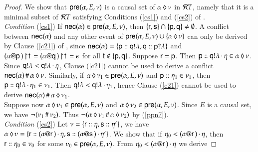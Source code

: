 \begin{proof}
  We show that ${\sf pre}(\alpha,E,\nu)$ is a causal set of
${\alpha}\,\lozenge\,{\nu}$ in ${\mathcal RT}$, namely that it is a minimal 
subset of ${\mathcal RT}$ satisfying Conditions (\ref{cs1}) and
(\ref{cs2}) of .\\ %
{\em Condition }(\ref{cs1}) If ${\sf nec}(\alpha) \in {\sf pre}(\alpha,E,\nu)$, then
$\{{\sf r},{\sf s}\} \cap \{{\sf p},{\sf q}\} \neq \emptyset$. A conflict between ${\sf nec}(\alpha)$ and any other event of
${\sf pre}(\alpha,E,\nu) \cup \{{\alpha}\,\lozenge\,{\nu}\}$ can only be derived
by Clause (\ref{c21}) of , since ${\sf nec}(\alpha)
=\{{\sf p}:: {\sf q}!\lambda,
  {\sf q}:: {\sf p}?\lambda\}$ and
$(\alpha @ {\sf p}\,) \! \upharpoonright \! {\sf t}\, = (\alpha @ {\sf q}\,) \! \upharpoonright \! {\sf t}\,
= \epsilon$ for all ${\sf t}\not\in\{{\sf p},{\sf q}\}$.  Suppose ${\sf r}
= {\sf p}$. Then ${\sf p}:: {\sf q}!\lambda\,{\cdot}\,\eta\in
{\alpha}\,\lozenge\,{\nu}$.  Since ${\sf q}!\lambda <
{\sf q}!\lambda\,{\cdot}\,\eta$,  Clause (\ref{c21}) cannot be
used to derive a conflict ${\sf nec}(\alpha) \,\#\,{\alpha}\,\lozenge\,{\nu}$.
Similarly, if $ {\alpha}\,\lozenge\,{\nu_1}\in {\sf pre}(\alpha,E,\nu)$ and
${\sf p}:: \eta_1\in \nu_1$, then
${\sf p}:: {\sf q}!\lambda\,{\cdot}\,\eta_1\in \nu_1$.
Then ${\sf q}!\lambda <
{\sf q}!\lambda\,{\cdot}\,\eta_1$, hence  Clause (\ref{c21})  
cannot be used to derive ${\sf nec}(\alpha)\,\#\, {\alpha}\,\lozenge\,{\nu_1}$.\\
Suppose now ${\alpha}\,\lozenge\,{\nu_1}\in {\sf pre}(\alpha,E,\nu)$ and  
${\alpha}\,\lozenge\,{\nu_2}\in {\sf pre}(\alpha,E,\nu)$. Since $E$ is a causal
set, we have $\neg(\nu_1\,\#\,\nu_2)$. Thus 
$\neg({\alpha}\,\lozenge\,{\nu_1}\,\#\,{\alpha}\,\lozenge\,{\nu_2})$ by
(\ref{ppn7}). \\
{\em Condition }(\ref{cs2}) Let $\nu=\{{\sf r}:: \eta,
  {\sf s}:: \eta'\}$, we have 
${\alpha}\,\lozenge\,{\nu} =\{{\sf r}:: (\alpha @ {\sf r}\,)\,{\cdot}\,\eta,
  {\sf s}:: (\alpha @ {\sf s}\,)\,{\cdot}\,\eta'\}$.  We 
show that if $\eta_0 < (\alpha @ {\sf r}\,)\,{\cdot}\,\eta$,
then ${\sf r}:: \eta_0 \in
\nu_0$ for some $\nu_0 \in {\sf pre}(\alpha,E,\nu)$.
From $\eta_0 < (\alpha @ {\sf r}\,)\,{\cdot}\,\eta$ we derive

\end{proof}

